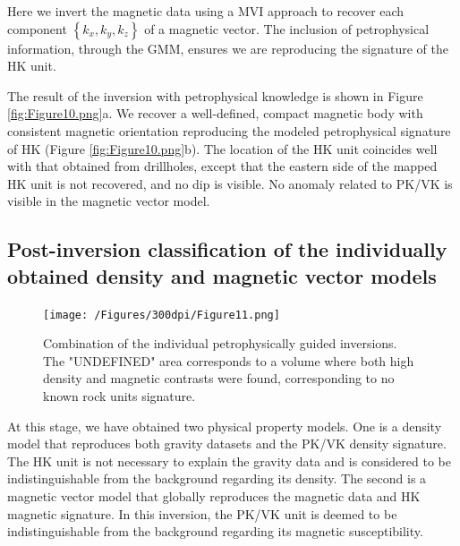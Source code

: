 \documentclass[paper, twocolumn]{geophysics} %
\begin{document}
Here we invert the magnetic data using a MVI approach to recover each component $\left\{k_x,k_y,k_z\right\}$ of a magnetic vector. The inclusion of petrophysical information, through the GMM, ensures we are reproducing the signature of the HK unit.

The result of the inversion with petrophysical knowledge is shown in Figure \ref{fig:Figure10.png}a. We recover a well-defined, compact magnetic body with consistent magnetic orientation reproducing the modeled petrophysical signature of HK (Figure \ref{fig:Figure10.png}b). The location of the HK unit coincides well with that obtained from drillholes, except that the eastern side of the mapped HK unit is not recovered, and no dip is visible. No anomaly related to PK/VK is visible in the magnetic vector model.

\subsection{Post-inversion classification of the individually obtained density and magnetic vector models}



\begin{figure}
\centering
\texttt{[image: /Figures/300dpi/Figure11.png]}
\caption{Combination of the individual petrophysically guided inversions. The "UNDEFINED" area corresponds to a volume where both high density and magnetic contrasts were found, corresponding to no known rock units signature.}
\label{fig:Figure11.png}
\end{figure}

At this stage, we have obtained two physical property models.
One is a density model that reproduces both gravity datasets and the PK/VK density signature. The HK unit is not necessary to explain the gravity data and is considered to be indistinguishable from the background regarding its density.
The second is a magnetic vector model that globally reproduces the magnetic data and HK magnetic signature. In this inversion, the PK/VK unit is deemed to be indistinguishable from the background regarding its magnetic susceptibility.
\end{document}
